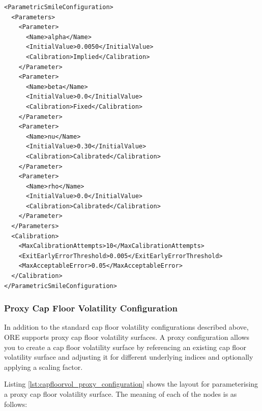 \begin{longlisting}
\begin{verbatim}
<ParametricSmileConfiguration>
  <Parameters>
    <Parameter>
      <Name>alpha</Name>
      <InitialValue>0.0050</InitialValue>
      <Calibration>Implied</Calibration>
    </Parameter>
    <Parameter>
      <Name>beta</Name>
      <InitialValue>0.0</InitialValue>
      <Calibration>Fixed</Calibration>
    </Parameter>
    <Parameter>
      <Name>nu</Name>
      <InitialValue>0.30</InitialValue>
      <Calibration>Calibrated</Calibration>
    </Parameter>
    <Parameter>
      <Name>rho</Name>
      <InitialValue>0.0</InitialValue>
      <Calibration>Calibrated</Calibration>
    </Parameter>
  </Parameters>
  <Calibration>
    <MaxCalibrationAttempts>10</MaxCalibrationAttempts>
    <ExitEarlyErrorThreshold>0.005</ExitEarlyErrorThreshold>
    <MaxAcceptableError>0.05</MaxAcceptableError>
  </Calibration>
</ParametricSmileConfiguration>
\end{verbatim}
\caption{Cap floor surface with optionlet volatilities input.}
\label{lst:capfloorvol_parametric_smile_config}
\end{longlisting}


\subsubsection{Proxy Cap Floor Volatility Configuration}

In addition to the standard cap floor volatility configurations described above, ORE supports proxy cap floor volatility surfaces. A proxy configuration allows you to create a cap floor volatility surface by referencing an existing cap floor volatility surface and adjusting it for different underlying indices and optionally applying a scaling factor.

Listing \ref{lst:capfloorvol_proxy_configuration} shows the layout for parameterising a proxy cap floor volatility surface. The meaning of each of the nodes is as follows:

